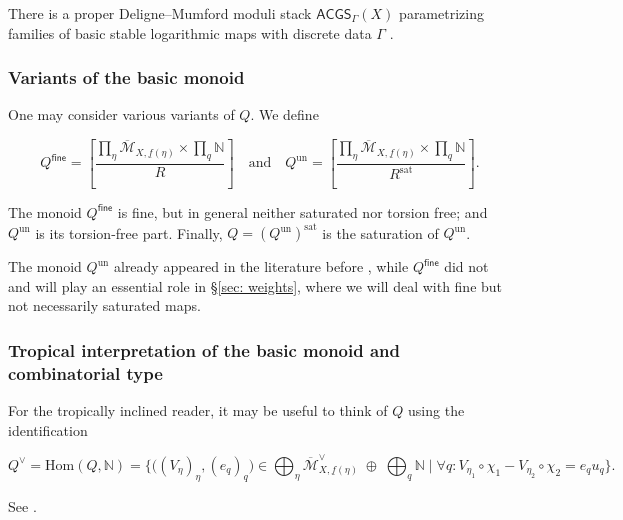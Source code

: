 \documentclass{article}
\def\N{{\mathbb{N}}}
\def\oM{\overline{\mathcal{M}}}
\begin{document}
There is a proper Deligne--Mumford moduli stack $\mathsf{ACGS}_{\Gamma}(X)$ parametrizing families of basic stable logarithmic maps with discrete data $\Gamma$ \cite[Theorem~2.4]{GS2013}.


    


\subsubsection{Variants of the basic monoid} \label{sec:define monoid}

One may consider various variants of $Q$. We define

\begin{equation}\label{eqn: variants of Q}
Q^{\mathsf{fine}} =
\left[
\frac{\prod_{\eta} \oM_{X,\underline{f}(\eta)} \times \prod_q \mathbb{N}}{R}
\right] \quad \text{and} \quad 
Q^{\mathrm{un}} =
\left[
\frac{\prod_{\eta} \oM_{X,\underline{f}(\eta)} \times \prod_q \mathbb{N}}{R^{\mathrm{sat}}}
\right].
\end{equation}

The monoid $Q^{\mathsf{fine}}$ is fine, but in general neither saturated nor torsion free; and $Q^{\mathrm{un}}$ is its torsion-free part. Finally,
$
Q = (Q^{\mathrm{un}})^{\mathrm{sat}}
$
is the saturation of $Q^{\mathrm{un}}$.

The monoid $Q^{\mathrm{un}}$ already appeared in the literature before \cite{R17}, while $Q^{\mathsf{fine}}$ did not and will play an essential role in \S\ref{sec: weights}, where we will deal with fine but not necessarily saturated maps.

\subsubsection{Tropical interpretation of the basic monoid and combinatorial type}

For the tropically inclined reader, it may be useful to think of $Q$ using the identification

\begin{equation}\label{eqn: dual-of-Q}
Q^\vee = \mathrm{Hom}(Q,\N)=
\Bigg\{
\bigl( (V_\eta)_\eta, (e_q)_q \bigr) \in \bigoplus_\eta \overline{\mathcal{M}}_{X,\underline{f}(\eta)}^\vee \;\oplus\; \bigoplus_q \N
\;\Big|\;
\forall q: V_{\eta_1} \circ \chi_1 - V_{\eta_2} \circ \chi_2 = e_q u_q
\Bigg\}.
\end{equation}

See \cite[Remark 1.18]{GS2013}.
\end{document}
